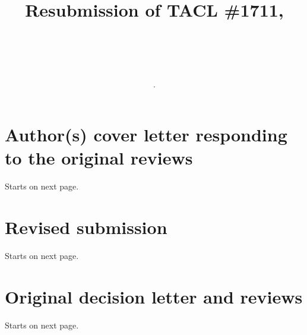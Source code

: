 \documentclass[11pt,a4paper,oneside]{article}
\title{Resubmission of TACL \#1711, \\ \subtitle.   \\}
\newcommand{\resubmission}{2018_tacl_trick.pdf}  %
\newcommand{\origdecision}{decision.pdf}  %
\newcommand{\coverfile}{our-cover-letter.pdf}  %
\begin{document}
\maketitle

\tableofcontents

\section{Author(s) cover letter responding to the original reviews} Starts on next page.

\section{Revised submission} Starts on next page.

\section{Original decision letter and reviews} Starts on next page.

\end{document}
